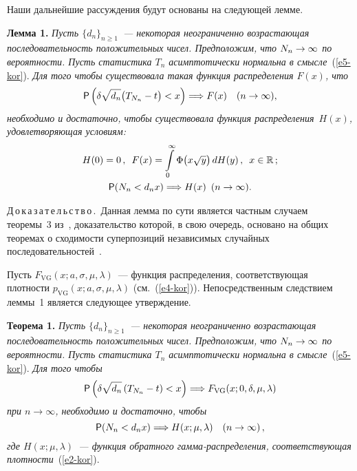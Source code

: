 \begin{multicols}{2}
Наши дальнейшие рассуждения будут основаны на следующей лемме.

\smallskip

\noindent
\textbf{Лемма 1.} \textit{Пусть $\{d_n\}_{n\ge1}$~--- некоторая
неограниченно возрастающая последовательность положительных чисел.
Предположим, что $N_n\hm\to\infty$ по вероятности. Пусть статистика
$T_n$ асимптотически нормальна в смысле}~(\ref{e5-kor}). \textit{Для того чтобы
существовала такая функция распределения $F(x)$, что}
$$
{\sf P}\left(\delta\sqrt{d_n}\bigl(T_{N_n}-t\bigr)<x\right)
\Longrightarrow F(x)\ \ \ (n\to\infty),
$$
\textit{необходимо и достаточно, чтобы существовала функция распределения~$H(x)$, 
удовлетворяющая условиям:}
\begin{gather*}
H(0)=0\,,\enskip
F(x)=\int\limits_{0}^{\infty}\Phi\big(x\sqrt{y}\big)\,dH(y)\,,\enskip x\in\mathbb{R}\,;\\
{\sf P}(N_n<d_nx)\Longrightarrow H(x) \enskip
(n\to\infty).
\end{gather*}


\smallskip

\noindent
Д\,о\,к\,а\,з\,а\,т\,е\,л\,ь\,с\,т\,в\,о\,.\ Данная лемма по сути является
частным случаем теоремы~3 из~\cite{Korolev1995}, доказательство
которой, в свою очередь, основано на общих теоремах о сходимости
суперпозиций независимых случайных последовательностей~\cite{Korolev1994, Korolev1996}.

\smallskip

Пусть $F_{\mathrm{VG}}(x;a,\sigma,\mu,\lambda)$~--- функция распределения,
соответствующая плотности $p_{\mathrm{VG}}(x;a,\sigma,\mu,\lambda)$ (см.~(\ref{e4-kor})). 
Непосредственным следствием леммы~1 является следующее
утверждение.

\smallskip

\noindent
\textbf{Теорема 1.} \textit{Пусть $\{d_n\}_{n\ge1}$~--- некоторая
неограниченно возрастающая последовательность положительных чисел.
Предположим, что $N_n\hm\to\infty$ по вероятности. Пусть статистика
$T_n$ асимптотически нормальна в смысле}~(\ref{e5-kor}). \textit{Для того чтобы}
$$
{\sf P}\left(\delta\sqrt{d_n}\left(T_{N_n}-t\right)<x\right)
\Longrightarrow F_{\mathrm{VG}}(x;0,\delta,\mu,\lambda)
$$
\textit{при $n\to\infty$, необходимо и достаточно, чтобы}
\begin{equation}
{\sf P}(N_n<d_nx)\Longrightarrow H(x;\mu,\lambda)\quad
(n\to\infty)\,,\label{e6-kor}
\end{equation}
\textit{где $H(x;\mu,\lambda)$~--- функция обратного гам\-ма-рас\-пре\-де\-ле\-ния,
соответствующая плот\-ности}~(\ref{e2-kor}). 


\end{multicols}
